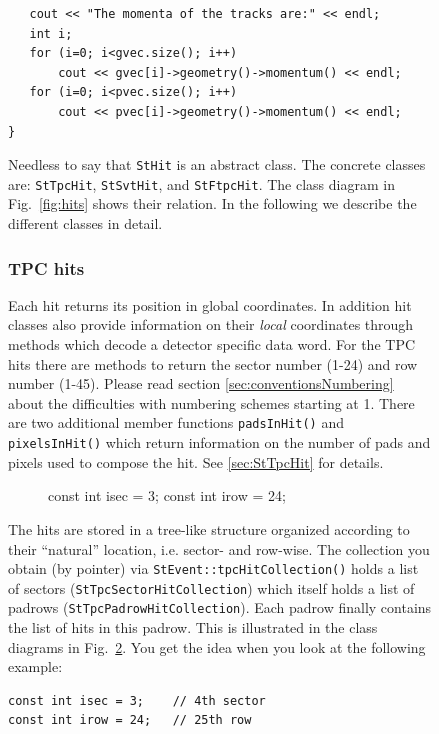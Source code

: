 \documentclass[twoside]{article}
\begin{document}
\begin{figure}[htb]
\begin{center}
\begin{verbatim}
   cout << "The momenta of the tracks are:" << endl;
   int i;
   for (i=0; i<gvec.size(); i++)
       cout << gvec[i]->geometry()->momentum() << endl;
   for (i=0; i<pvec.size(); i++)
       cout << pvec[i]->geometry()->momentum() << endl;
}

\end{verbatim}

Needless to say that \texttt{StHit} is an abstract class. The concrete
classes are: \texttt{StTpcHit}, \texttt{StSvtHit}, and
\texttt{StFtpcHit}. The class diagram in Fig.~\ref{fig:hits} shows
their relation. In the following we describe the different classes in
detail.

\subsubsection{TPC hits}
  
  Each hit returns its position in global
coordinates. In addition hit classes also provide information on their
\emph{local} coordinates through methods which decode a detector
specific data word. For the TPC hits there are methods to return the
sector number (1-24) and row number (1-45).  Please read section
\ref{sec:conventionsNumbering} about the difficulties with numbering
schemes starting at 1.  There are two additional member functions
\texttt{padsInHit()} and \texttt{pixelsInHit()} which return
information on the number of pads and pixels used to compose the hit.
See \ref{sec:StTpcHit} for details.
\begin{figure}[htb]
    \begin{center}
const int isec = 3;
const int irow = 24;
        \label{fig:tpc}
    \end{center}
\end{figure}

The hits are stored in a tree-like structure organized
according to their ``natural'' location, i.e. sector- and row-wise.
The collection you obtain (by pointer) via
\texttt{StEvent::tpcHitCollection()} holds a list of sectors
(\texttt{StTpcSectorHitCollection}) which itself holds a list of padrows
(\texttt{StTpcPadrowHitCollection}). Each padrow finally contains the list of
hits in this padrow. This is illustrated in the class diagrams in
Fig.~\ref{fig:tpc}. You get the idea when you look at the following
example:
\begin{verbatim}
const int isec = 3;    // 4th sector
const int irow = 24;   // 25th row


\end{verbatim}
\end{center}
\end{figure}
\end{document}
